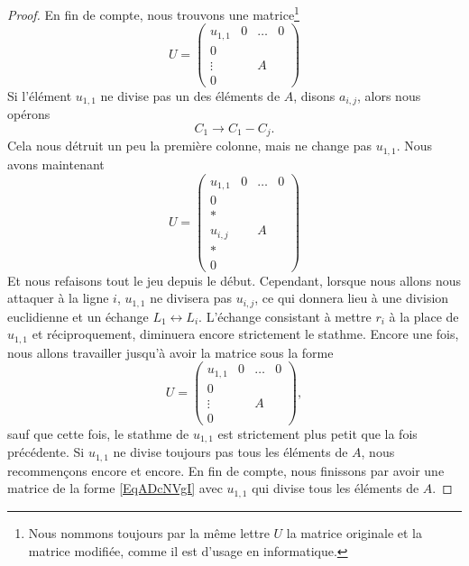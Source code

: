 \begin{proof}
	En fin de compte, nous trouvons une matrice\footnote{Nous nommons toujours par la même lettre \( U\) la matrice originale et la matrice modifiée, comme il est d'usage en informatique.}
	\begin{equation}
		U=\begin{pmatrix}
			u_{1,1} & 0 & \ldots & 0    \\
			0       &   &        &      \\
			\vdots  &   & A      &      \\
			0       &   &        &
		\end{pmatrix}
	\end{equation}
	Si l'élément \( u_{1,1}\) ne divise pas un des éléments de \( A\), disons \( a_{i,j}\), alors nous opérons
	\begin{equation}
		C_1\to C_1-C_j.
	\end{equation}
	Cela nous détruit un peu la première colonne, mais ne change pas \( u_{1,1}\). Nous avons maintenant
	\begin{equation}
		U=\begin{pmatrix}
			u_{1,1} & 0 & \ldots & 0    \\
			0       &   &        &      \\
			*       &   &        &      \\
			u_{i,j} &   & A      &      \\
			*       &   &        &      \\
			0       &   &        &
		\end{pmatrix}
	\end{equation}
	Et nous refaisons tout le jeu depuis le début. Cependant, lorsque nous allons nous attaquer à la ligne \( i\), \( u_{1,1}\) ne divisera pas \( u_{i,j}\), ce qui donnera lieu à une division euclidienne et un échange \( L_1\leftrightarrow L_i\). L'échange consistant à mettre \( r_i\) à la place de \( u_{1,1}\) et réciproquement, diminuera encore strictement le stathme. Encore une fois, nous allons travailler jusqu'à avoir la matrice sous la forme
	\begin{equation}    \label{EqADcNVgI}
		U=\begin{pmatrix}
			u_{1,1} & 0 & \ldots & 0    \\
			0       &   &        &      \\
			\vdots  &   & A      &      \\
			0       &   &        &
		\end{pmatrix},
	\end{equation}
	sauf que cette fois, le stathme de \( u_{1,1}\) est strictement plus petit que la fois précédente. Si \( u_{1,1}\) ne divise toujours pas tous les éléments de \( A\), nous recommençons encore et encore. En fin de compte, nous finissons par avoir une matrice de la forme \eqref{EqADcNVgI} avec \( u_{1,1}\) qui divise tous les éléments de \( A\).


\end{proof}
